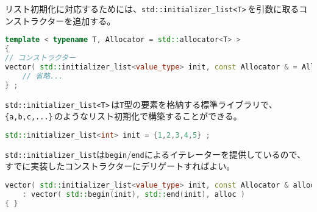 リスト初期化に対応するためには、\texttt{std::initializer\_list<T>}\,を引数に取るコンストラクターを追加する。

 \ifTombow\enlargethispage{3mm}\fi
\begin{lstlisting}[language={C++}]
template < typename T, Allocator = std::allocator<T> >
{
// コンストラクター
vector( std::initializer_list<value_type> init, const Allocator & = Allocator() ) ; 
    // 省略...
} ;
\end{lstlisting}

\texttt{std::initializer\_list<T>}\,は\texttt{T}型の要素を格納する標準ライブラリで、\texttt{\{a,b,c,...\}}\,のようなリスト初期化で構築することができる。

\begin{lstlisting}[language={C++}]
std::initializer_list<int> init = {1,2,3,4,5} ;
\end{lstlisting}

\texttt{std::initializer\_list}は\texttt{begin}/\texttt{end}によるイテレーターを提供しているので、すでに実装したコンストラクターにデリゲートすればよい。

\begin{lstlisting}[language={C++}]
vector( std::initializer_list<value_type> init, const Allocator & alloc = Allocator() ) ; 
    : vector( std::begin(init), std::end(init), alloc )
{ }
\end{lstlisting}
